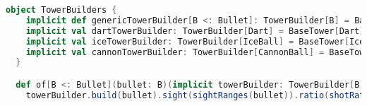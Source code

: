\begin{lstlisting}[label=code:builder, language=Scala, caption=Builder delle tipologie di torre]
object TowerBuilders {
    implicit def genericTowerBuilder[B <: Bullet]: TowerBuilder[B] = BaseTower[B](_)
    implicit val dartTowerBuilder: TowerBuilder[Dart] = BaseTower[Dart](_)
    implicit val iceTowerBuilder: TowerBuilder[IceBall] = BaseTower[IceBall](_)
    implicit val cannonTowerBuilder: TowerBuilder[CannonBall] = BaseTower[CannonBall](_)
  }

  def of[B <: Bullet](bullet: B)(implicit towerBuilder: TowerBuilder[B]): Tower[B] =
    towerBuilder.build(bullet).sight(sightRanges(bullet)).ratio(shotRatios(bullet))
\end{lstlisting}